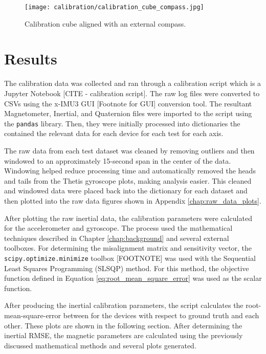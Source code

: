 \begin{figure}[h!]
    \centering
    \texttt{[image: calibration/calibration\_cube\_compass.jpg]}
    \caption{Calibration cube aligned with an external compass.}
    \label{fig:calibration_cube_gear}
\end{figure}

\section{Results}
The calibration data was collected and ran through a calibration script which is a Jupyter Notebook [CITE - calibration script].
The raw log files were converted to CSVs using the x-IMU3 GUI [Footnote for GUI] conversion tool.
The resultant Magnetometer, Inertial, and Quaternion files were imported to the script using the \lstinline[style=customInline]|pandas| library.
Then, they were initially processed into dictionaries the contained the relevant data for each device for each test for each axis.

The raw data from each test dataset was cleaned by removing outliers and then windowed to an approximately 15-second span in the center of the data.
Windowing helped reduce processing time and automatically removed the heads and tails from the Thetis gyroscope plots, making analysis easier.
This cleaned and windowed data were placed back into the dictionary for each dataset and then plotted into the raw data figures shown in Appendix \ref{chap:raw_data_plots}.

After plotting the raw inertial data, the calibration parameters were calculated for the accelerometer and gyroscope.
The process used the mathematical techniques described in Chapter \ref{chap:background} and several external toolboxes.
For determining the misalignment matrix and sensitivity vector, the \lstinline[style=customInline]|scipy.optimize.minimize| toolbox [FOOTNOTE] was used with the Sequential Least Squares Programming (SLSQP) method.
For this method, the objective function defined in Equation \ref{eq:root_mean_square_error} was used as the scalar function.

After producing the inertial calibration parameters, the script calculates the root-mean-square-error between for the devices with respect to ground truth and each other. 
These plots are shown in the following section.
After determining the inertial RMSE, the magnetic parameters are calculated using the previously discussed mathematical methods and several plots generated.

